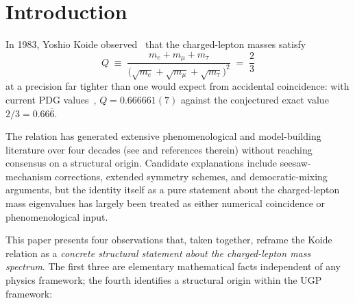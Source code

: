 \documentclass[11pt]{article}
\theoremstyle{remark}
\begin{document}
\section{Introduction}
\label{sec:intro}

In 1983, Yoshio Koide observed~\cite{Koide1983} that the charged-lepton masses satisfy
\begin{equation}
Q \;\equiv\; \frac{m_e + m_\mu + m_\tau}{\bigl(\sqrt{m_e} + \sqrt{m_\mu} + \sqrt{m_\tau}\bigr)^2} \;=\; \frac{2}{3}
\label{eq:koide}
\end{equation}
at a precision far tighter than one would expect from accidental coincidence: with current PDG values~\cite{ParticleDataGroup2022}, $Q = 0.666661(7)$ against the conjectured exact value $2/3 = 0.66\overline{6}$.

The relation has generated extensive phenomenological and model-building literature over four decades (see \cite{Foot1994,LiMa2006,XingZhao2019} and references therein) without reaching consensus on a structural origin.  Candidate explanations include seesaw-mechanism corrections, extended symmetry schemes, and democratic-mixing arguments, but the identity itself as a pure statement about the charged-lepton mass eigenvalues has largely been treated as either numerical coincidence or phenomenological input.

This paper presents four observations that, taken together, reframe the Koide relation as a \emph{concrete structural statement about the charged-lepton mass spectrum}.  The first three are elementary mathematical facts independent of any physics framework; the fourth identifies a structural origin within the UGP framework:
\end{document}
